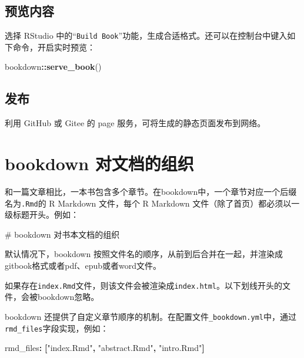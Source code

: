 \documentclass[]{ctexbook}
\newenvironment{Shaded}{\begin{snugshade}}{\end{snugshade}}
\newcommand{\AttributeTok}[1]{\textcolor[rgb]{0.77,0.63,0.00}{#1}}
\newcommand{\FunctionTok}[1]{\textcolor[rgb]{0.00,0.00,0.00}{#1}}
\newcommand{\KeywordTok}[1]{\textcolor[rgb]{0.13,0.29,0.53}{\textbf{#1}}}
\newcommand{\NormalTok}[1]{#1}
\newcommand{\OperatorTok}[1]{\textcolor[rgb]{0.81,0.36,0.00}{\textbf{#1}}}
\newcommand{\StringTok}[1]{\textcolor[rgb]{0.31,0.60,0.02}{#1}}
\begin{document}
\hypertarget{ux9884ux89c8ux5185ux5bb9}{%
\subsection{预览内容}\label{ux9884ux89c8ux5185ux5bb9}}

选择 RStudio 中的``\texttt{Build\ Book}''功能，生成合适格式。还可以在控制台中键入如下命令，开启实时预览：

\begin{Shaded}
\begin{Highlighting}[]
\NormalTok{bookdown}\OperatorTok{::}\KeywordTok{serve_book}\NormalTok{()}
\end{Highlighting}
\end{Shaded}

\hypertarget{ux53d1ux5e03}{%
\subsection{发布}\label{ux53d1ux5e03}}

利用 GitHub 或 Gitee 的 page 服务，可将生成的静态页面发布到网络。

\hypertarget{bookdown-ux5bf9ux6587ux6863ux7684ux7ec4ux7ec7}{%
\section{bookdown 对文档的组织}\label{bookdown-ux5bf9ux6587ux6863ux7684ux7ec4ux7ec7}}

和一篇文章相比，一本书包含多个章节。在bookdown中，一个章节对应一个后缀名为\texttt{.Rmd}的 R Markdown 文件，每个 R Markdown 文件（除了首页）都必须以一级标题开头。例如：

\begin{Shaded}
\begin{Highlighting}[]
\FunctionTok{# bookdown 对书本文档的组织}
\end{Highlighting}
\end{Shaded}

默认情况下，bookdown 按照文件名的顺序，从前到后合并在一起，并渲染成gitbook格式或者pdf、epub或者word文件。

如果存在\texttt{index.Rmd}文件，则该文件会被渲染成\texttt{index.html}。以下划线开头的文件，会被bookdown忽略。

bookdown 还提供了自定义章节顺序的机制。在配置文件\texttt{\_bookdown.yml}中，通过\texttt{rmd\_files}字段实现，例如：

\begin{Shaded}
\begin{Highlighting}[]
\FunctionTok{rmd_files}\KeywordTok{:}\AttributeTok{ }\KeywordTok{[}\StringTok{"index.Rmd"}\KeywordTok{,}\AttributeTok{ }\StringTok{"abstract.Rmd"}\KeywordTok{,}\AttributeTok{ }\StringTok{"intro.Rmd"}\KeywordTok{]}
\end{Highlighting}
\end{Shaded}
\end{document}
